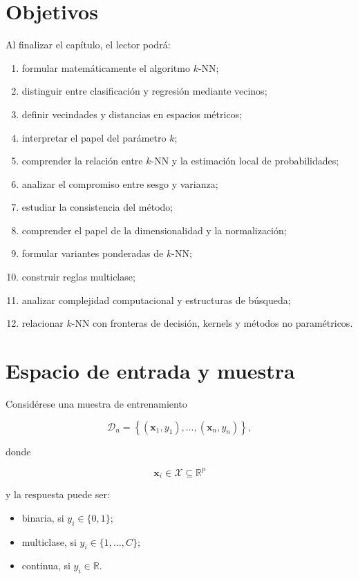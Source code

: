 \documentclass[
  spanish,
  11pt,
  letterpaper,
  DIV=11,
  numbers=noendperiod]{scrreprt}
\providecommand{\tightlist}{%
  \setlength{\itemsep}{0pt}\setlength{\parskip}{0pt}}
\theoremstyle{definition}
\theoremstyle{plain}
\theoremstyle{definition}
\theoremstyle{remark}
\begin{document}
\section{Objetivos}\label{objetivos-11}

Al finalizar el capítulo, el lector podrá:

\begin{enumerate}
\def\labelenumi{\arabic{enumi}.}
\tightlist
\item
  formular matemáticamente el algoritmo \(k\)-NN;
\item
  distinguir entre clasificación y regresión mediante vecinos;
\item
  definir vecindades y distancias en espacios métricos;
\item
  interpretar el papel del parámetro \(k\);
\item
  comprender la relación entre \(k\)-NN y la estimación local de
  probabilidades;
\item
  analizar el compromiso entre sesgo y varianza;
\item
  estudiar la consistencia del método;
\item
  comprender el papel de la dimensionalidad y la normalización;
\item
  formular variantes ponderadas de \(k\)-NN;
\item
  construir reglas multiclase;
\item
  analizar complejidad computacional y estructuras de búsqueda;
\item
  relacionar \(k\)-NN con fronteras de decisión, kernels y métodos no
  paramétricos.
\end{enumerate}

\section{Espacio de entrada y
muestra}\label{espacio-de-entrada-y-muestra}

Considérese una muestra de entrenamiento

\[
\mathcal{D}_n
=
\left\{
(\mathbf{x}_1,y_1),
\ldots,
(\mathbf{x}_n,y_n)
\right\},
\]

donde

\[
\mathbf{x}_i\in\mathcal{X}\subseteq\mathbb{R}^p
\]

y la respuesta puede ser:

\begin{itemize}
\tightlist
\item
  binaria, si \(y_i\in\{0,1\}\);
\item
  multiclase, si \(y_i\in\{1,\ldots,C\}\);
\item
  continua, si \(y_i\in\mathbb{R}\).
\end{itemize}
\end{document}
